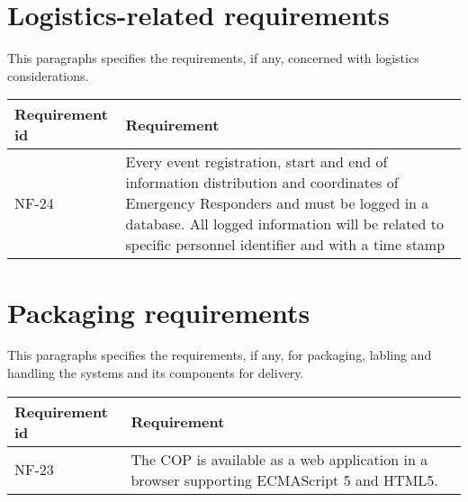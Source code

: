 


\section{Logistics-related requirements}
This paragraphs specifies the requirements, if  any, concerned with logistics considerations.

\begin{longtable}{| p{3.2cm} |  p{10cm} | }
	\hline
	\textbf{Requirement id} &  \textbf{Requirement } \\
	\hline
	NF-24 & Every event registration, start and end of information distribution and coordinates of Emergency Responders and must be logged in a database. All logged information will be related to specific personnel identifier and with a time stamp  \\
	\hline
\end{longtable}

\newpage
\label{sec_nonFunc7}
\section{Packaging requirements}
This paragraphs specifies the requirements, if any, for packaging, labling and handling the systems and its components for delivery.

\begin{longtable}{| p{3.2cm} |  p{10cm} | }
	\hline
	\textbf{Requirement id} &  \textbf{Requirement } \\
	\hline
	NF-23 & The COP is available as a web application in a browser supporting ECMAScript 5 and HTML5. \\
	\hline
\end{longtable}